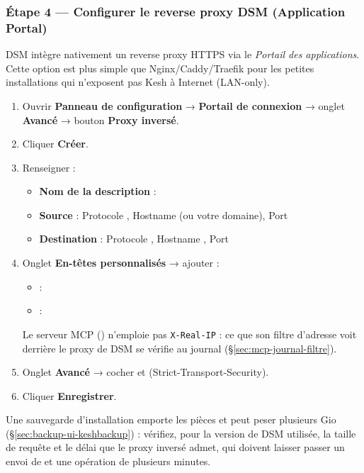 \documentclass[a4paper,11pt,oneside]{article}
\begin{document}
\subsubsection{Étape 4 — Configurer le reverse proxy DSM (Application Portal)}

DSM intègre nativement un reverse proxy HTTPS via le \emph{Portail des applications}. Cette option est plus simple que Nginx/Caddy/Traefik pour les petites installations qui n'exposent pas Kesh à Internet (LAN-only).

\begin{enumerate}
    \item Ouvrir \textbf{Panneau de configuration} → \textbf{Portail de connexion} → onglet \textbf{Avancé} → bouton \textbf{Proxy inversé}.
    \item Cliquer \textbf{Créer}.
    \item Renseigner :
        \begin{itemize}
            \item \textbf{Nom de la description} : 
            \item \textbf{Source} : Protocole , Hostname  (ou votre domaine), Port 
            \item \textbf{Destination} : Protocole , Hostname , Port 
        \end{itemize}
    \item Onglet \textbf{En-têtes personnalisés} → ajouter :
        \begin{itemize}
            \item {} : 
            \item {} : 
        \end{itemize}
        Le serveur MCP () n'emploie pas \texttt{X-Real-IP} : ce que son filtre d'adresse voit derrière le proxy de DSM se vérifie au journal (\S\ref{sec:mcp-journal-filtre}).
    \item Onglet \textbf{Avancé} → cocher  et  (Strict-Transport-Security).
    \item Cliquer \textbf{Enregistrer}.
\end{enumerate}

Une sauvegarde d'installation  emporte les pièces et peut peser plusieurs Gio (\S\ref{sec:backup-ui-keshbackup}) : vérifiez, pour la version de DSM utilisée, la taille de requête et le délai que le proxy inversé admet, qui doivent laisser passer un envoi de  et une opération de plusieurs minutes.
\end{document}
